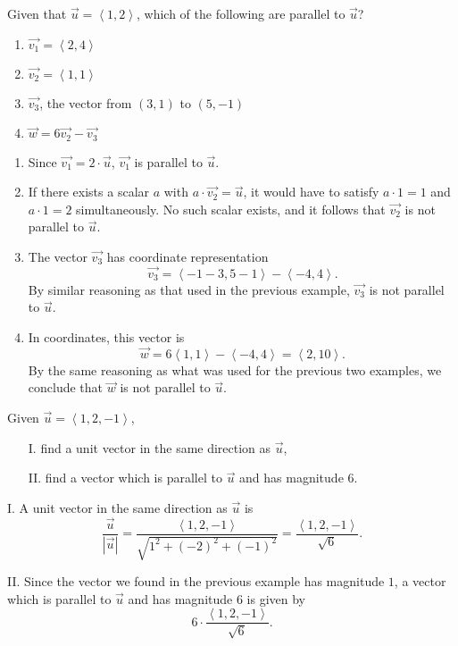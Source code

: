 \documentclass[]{ximera}
\begin{document}
\begin{problem}
Given that $\vec{u} = \left<1,2\right>$, which of the following are parallel to $\vec{u}$?

\begin{enumerate}[label=(\alph*)]
\item $\vec{v_1}=\left<2,4\right>$
\item $\vec{v_2}=\left<1,1\right>$ 
\item $\vec{v_3}$, the vector from $(3,1)$ to $(5,-1)$
\item $\vec{w} = 6 \vec{v_2} - \vec{v_3}$
\end{enumerate}

\begin{solution}
\begin{enumerate}[label=(\alph*)]
\item Since $\vec{v_1} = 2 \cdot \vec{u}$, $\vec{v_1}$ is parallel to $\vec{u}$. 
\item If there exists a scalar $a$ with $a \cdot \vec{v_2} = \vec{u}$, it would have to satisfy $a \cdot 1 = 1$ and $a \cdot 1 = 2$ simultaneously. No such scalar exists, and it follows that $\vec{v_2}$ is not parallel to $\vec{u}$. 
\item The vector $\vec{v_3}$ has coordinate representation 
$$
\vec{v_3} = \left<-1 - 3, 5 - 1\right> - \left<-4, 4\right>.
$$
By similar reasoning as that used in the previous example, $\vec{v_3}$ is not parallel to $\vec{u}$.
\item In coordinates, this vector is 
$$
\vec{w} = 6 \left<1,1\right> - \left<-4,4\right> = \left<2,10\right>.
$$
By the same reasoning as what was used for the previous two examples, we conclude that $\vec{w}$ is not parallel to $\vec{u}$. 
\end{enumerate}
\end{solution}
\end{problem}

\begin{problem}
Given $\vec{u} = \left<1,2,-1\right>$,
\begin{itemize}
\item[I.] find a unit vector in the same direction as $\vec{u}$,
\item[II.] find a vector which is parallel to $\vec{u}$ and has magnitude $6$.
\end{itemize}
\begin{solution}
I. A unit vector in the same direction as $\vec{u}$ is 
$$
\frac{\vec{u}}{\left|\vec{u}\right|} = \frac{\left<1,2,-1\right>}{\sqrt{1^2 + (-2)^2 + (-1)^2}} = \frac{\left<1,2,-1\right>}{\sqrt{6}}.
$$

II. Since the vector we found in the previous example has magnitude $1$, a vector which is parallel to $\vec{u}$ and has magnitude $6$ is given by
$$
6 \cdot \frac{\left<1,2,-1\right>}{\sqrt{6}}.
$$
\end{solution}
\end{problem}
\end{document}
